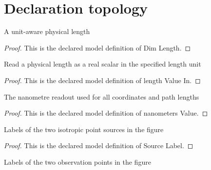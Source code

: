 \section{Declaration topology}
\begin{definition}
  \label{def:physics:phyx-mini-0087:phyxminiproblems-problemphyxmini0087-dimlength}
  A unit-aware physical length
\end{definition}
\begin{proof}
  This is the declared model definition of Dim Length.
\end{proof}
\begin{definition}
  \label{def:physics:phyx-mini-0087:phyxminiproblems-problemphyxmini0087-lengthvaluein}
  Read a physical length as a real scalar in the specified length unit
\end{definition}
\begin{proof}
  This is the declared model definition of length Value In.
\end{proof}
\begin{definition}
  \label{def:physics:phyx-mini-0087:phyxminiproblems-problemphyxmini0087-nanometersvalue}
  The nanometre readout used for all coordinates and path lengths
\end{definition}
\begin{proof}
  This is the declared model definition of nanometers Value.
\end{proof}
\begin{definition}
  \label{def:physics:phyx-mini-0087:phyxminiproblems-problemphyxmini0087-sourcelabel}
  Labels of the two isotropic point sources in the figure
\end{definition}
\begin{proof}
  This is the declared model definition of Source Label.
\end{proof}
\begin{definition}
  \label{def:physics:phyx-mini-0087:phyxminiproblems-problemphyxmini0087-observationlabel}
  Labels of the two observation points in the figure
\end{definition}
